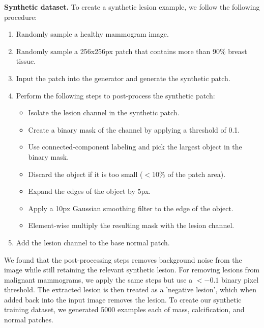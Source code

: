 \documentclass{article}
\begin{document}
\noindent\textbf{Synthetic dataset.}
To create a synthetic lesion example, we follow the following procedure:
\begin{enumerate}
    \item Randomly sample a healthy mammogram image.
    \item Randomly sample a 256x256px patch that contains more than 90\% breast tissue.
    \item Input the patch into the generator and generate the synthetic patch.
    \item Perform the following steps to post-process the synthetic patch:
    \begin{itemize}
        \item Isolate the lesion channel in the synthetic patch.
        \item Create a binary mask of the channel by applying a threshold of 0.1.
        \item Use connected-component labeling and pick the largest object in the binary mask.
        \item Discard the object if it is too small ($<10\%$ of the patch area).
        \item Expand the edges of the object by 5px.
        \item Apply a 10px Gaussian smoothing filter to the edge of the object.
        \item Element-wise multiply the resulting mask with the lesion channel.
    \end{itemize}
    \item Add the lesion channel to the base normal patch.
\end{enumerate}
We found that the post-processing steps removes background noise from the image while still retaining the relevant synthetic lesion.
For removing lesions from malignant mammograms, we apply the same steps but use a $<-0.1$ binary pixel threshold. The extracted lesion is then treated as a 'negative lesion', which when added back into the input image removes the lesion.
To create our synthetic training dataset, we generated 5000 examples each of mass, calcification, and normal patches.\\
\end{document}
